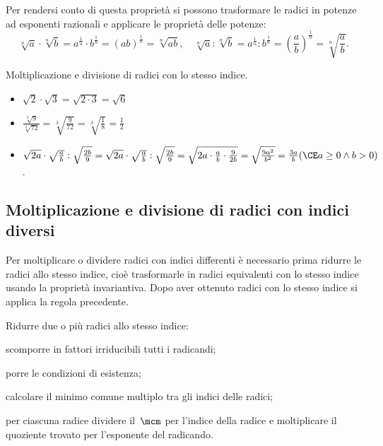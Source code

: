Per rendersi conto di questa proprietà si possono trasformare le radici in 
potenze ad esponenti razionali e applicare le proprietà delle potenze:
 \[\sqrt[n]a\cdot \sqrt[n]b=a^{\frac 1 n}\cdot b^{\frac 1 n}=(ab)^{\frac 1 n}=
   \sqrt[n]{ab},\quad \sqrt[n]a:\sqrt[n]b=a^{\frac 1 n}:b^{\frac 1 n}=
   \left(\dfrac a b\right)^{\frac 1 n}=\sqrt[n]{\dfrac a b}.\]

\begin{exrig}
 \begin{esempio}
Moltiplicazione e divisione di radici con lo stesso indice.
\begin{itemize}
\item $\sqrt 2\cdot \sqrt 3=\sqrt{2\cdot 3}=\sqrt 6$
\item $\frac{\sqrt[3]9}{\sqrt[3]{72}}=\sqrt[3]{\frac 9{72}}=
       \sqrt[3]{\frac 1 8}=\frac 1 2$
\item $\sqrt{2a}\cdot \sqrt{\frac a b}:\sqrt{\frac {2b} 9}=
       \sqrt{2a}\cdot \sqrt{\frac a b}:\sqrt{\frac {2b} 9}=
       \sqrt{2a\cdot \frac a b\cdot \frac 9{2b}}=\sqrt{\frac{9a^2}{b^2}}=
       \frac {3a} b 
      (\CE a\ge 0\wedge b>0)$.
\end{itemize}
 \end{esempio}
\end{exrig}

\subsection{Moltiplicazione e divisione di radici con indici diversi}
Per moltiplicare o dividere radici con indici differenti è necessario prima 
ridurre le radici allo stesso indice, cioè trasformarle in radici equivalenti 
con lo stesso indice usando la proprietà invariantiva. Dopo aver ottenuto 
radici con lo stesso indice si applica la regola precedente.

\begin{procedura}
Ridurre due o più radici allo stesso indice:
\begin{enumeratea}
 \item scomporre in fattori irriducibili tutti i radicandi;
 \item porre le condizioni di esistenza;
 \item calcolare il minimo comune multiplo tra gli indici delle radici;
 \item per ciascuna radice dividere il~$\mcm$ per l'indice della radice e 
  moltiplicare il quoziente trovato per l'esponente del radicando.
\end{enumeratea}
\end{procedura}

